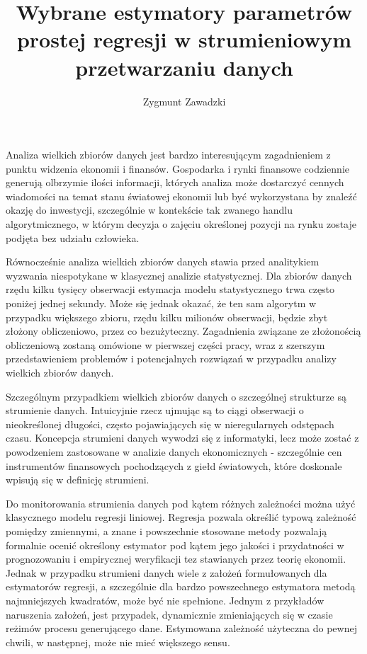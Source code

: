 \documentclass[man,mfu]{mgrwms}
\title{Wybrane estymatory parametrów prostej regresji w strumieniowym przetwarzaniu danych}
\author{Zygmunt Zawadzki}
\begin{document}


\maketitle

\tableofcontents


\begin{wstep}



Analiza wielkich zbiorów danych jest bardzo interesującym zagadnieniem z punktu widzenia ekonomii i finansów. Gospodarka i rynki finansowe codziennie generują olbrzymie ilości informacji, których analiza może dostarczyć cennych wiadomości na temat stanu światowej ekonomii lub być wykorzystana by znaleźć okazję do inwestycji, szczególnie w kontekście tak zwanego handlu algorytmicznego, w którym decyzja o zajęciu określonej pozycji na rynku zostaje podjęta bez udziału człowieka.

Równocześnie analiza wielkich zbiorów danych stawia przed analitykiem wyzwania niespotykane w klasycznej analizie statystycznej. Dla zbiorów danych rzędu kilku tysięcy obserwacji estymacja modelu statystycznego trwa często poniżej jednej sekundy. Może się jednak okazać, że ten sam algorytm w przypadku większego zbioru, rzędu kilku milionów obserwacji, będzie zbyt złożony obliczeniowo, przez co bezużyteczny. Zagadnienia związane ze złożonością obliczeniową zostaną omówione w pierwszej części pracy, wraz z szerszym przedstawieniem problemów i potencjalnych rozwiązań w przypadku analizy wielkich zbiorów danych. 

Szczególnym przypadkiem wielkich zbiorów danych o szczególnej strukturze są strumienie danych. Intuicyjnie rzecz ujmując są to ciągi obserwacji o nieokreślonej długości, często pojawiających się w nieregularnych odstępach czasu. Koncepcja strumieni danych wywodzi się z informatyki, lecz może zostać z powodzeniem zastosowane w analizie danych ekonomicznych - szczególnie cen instrumentów finansowych pochodzących z giełd światowych, które doskonale wpisują się w definicję strumieni.

Do monitorowania strumienia danych pod kątem różnych zależności można użyć klasycznego modelu regresji liniowej. Regresja pozwala określić typową zależność pomiędzy zmiennymi, a znane i powszechnie stosowane metody pozwalają formalnie ocenić określony estymator pod kątem jego jakości i przydatności w prognozowaniu i empirycznej weryfikacji tez stawianych przez teorię ekonomii. Jednak w przypadku strumieni danych wiele z założeń formułowanych dla estymatorów regresji, a szczególnie dla bardzo powszechnego estymatora metodą najmniejszych kwadratów, może być nie spełnione. Jednym z przykładów naruszenia założeń, jest przypadek, dynamicznie zmieniających się w czasie reżimów procesu generującego dane. Estymowana zależność użyteczna do pewnej chwili, w następnej, może nie mieć większego sensu. 


\end{wstep}
\end{document}
